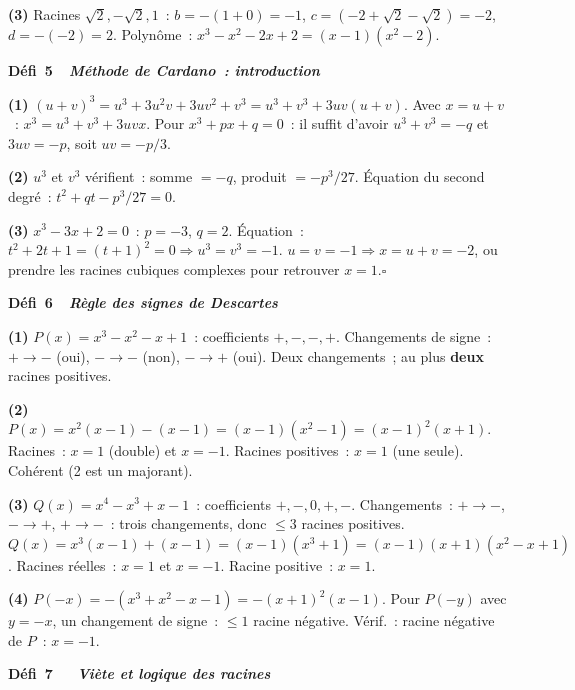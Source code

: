 \textbf{(3)} Racines $\sqrt{2},-\sqrt{2},1$~: $b=-(1+0)=-1$, $c=(-2+\sqrt{2}-\sqrt{2})=-2$,
$d=-(-2)=2$. Polyn\^ome~: $x^3-x^2-2x+2=(x-1)(x^2-2)$.

\noindent{}
{\color{BO}\bfseries\small D\'efi~5~\textendash\ \textit{M\'ethode de Cardano~: introduction}}
\par\smallskip

\textbf{(1)} $(u+v)^3=u^3+3u^2v+3uv^2+v^3=u^3+v^3+3uv(u+v)$.
Avec $x=u+v$~: $x^3=u^3+v^3+3uvx$.
Pour $x^3+px+q=0$~: il suffit d'avoir $u^3+v^3=-q$ et $3uv=-p$, soit $uv=-p/3$.

\textbf{(2)} $u^3$ et $v^3$ v\'erifient~: somme $=-q$, produit $=-p^3/27$.
\'Equation du second degr\'e~: $t^2+qt-p^3/27=0$.

\textbf{(3)} $x^3-3x+2=0$~: $p=-3$, $q=2$.
\'Equation~: $t^2+2t+1=(t+1)^2=0\Rightarrow u^3=v^3=-1$.
$u=v=-1\Rightarrow x=u+v=-2$, ou prendre les racines cubiques complexes pour retrouver $x=1$.\hfill$\square$

\noindent{}
{\color{BO}\bfseries\small D\'efi~6~\textendash\ \textit{R\`egle des signes de Descartes}}
\par\smallskip

\textbf{(1)} $P(x)=x^3-x^2-x+1$~: coefficients $+,-,-,+$.
Changements de signe~: $+\to-$ (oui), $-\to-$ (non), $-\to+$ (oui).
Deux changements~; au plus \textbf{deux} racines positives.

\textbf{(2)} $P(x)=x^2(x-1)-(x-1)=(x-1)(x^2-1)=(x-1)^2(x+1)$.
Racines~: $x=1$ (double) et $x=-1$. Racines positives~: $x=1$ (une seule). Coh\'erent (2 est un majorant).\checkmark

\textbf{(3)} $Q(x)=x^4-x^3+x-1$~: coefficients $+,-,0,+,-$.
Changements~: $+\to-$, $-\to+$, $+\to-$~: trois changements, donc $\leq3$ racines positives.
$Q(x)=x^3(x-1)+(x-1)=(x-1)(x^3+1)=(x-1)(x+1)(x^2-x+1)$.
Racines r\'eelles~: $x=1$ et $x=-1$. Racine positive~: $x=1$.\checkmark

\textbf{(4)} $P(-x)=-(x^3+x^2-x-1)=-(x+1)^2(x-1)$.
Pour $P(-y)$ avec $y=-x$, un changement de signe~: $\leq1$ racine n\'egative.
V\'erif.~: racine n\'egative de $P$~: $x=-1$.\checkmark

\noindent{}
{\color{BO}\bfseries\small D\'efi~7~\textendash\ \textit{\logiq\ Vi\`ete et logique des racines}}
\par\smallskip

